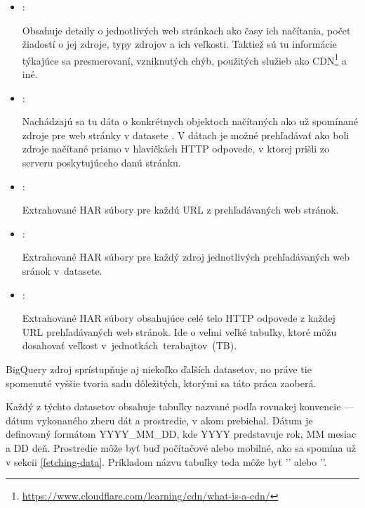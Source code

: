 \begin{itemize}
    \item {}:

    Obsahuje detaily o jednotlivých web stránkach ako časy ich načítania, počet žiadostí o jej zdroje, typy zdrojov a ich veľkosti.
    Taktiež sú tu informácie týkajúce sa presmerovaní, vzniknutých chýb, použitých služieb ako CDN\footnote{\href{https://www.cloudflare.com/learning/cdn/what-is-a-cdn/}{https://www.cloudflare.com/learning/cdn/what-is-a-cdn/}} a iné.
    
    \item {}:

    Nachádzajú sa tu dáta o konkrétnych objektoch načítaných ako už spomínané zdroje pre web stránky v datasete .
    V dátach je možné prehľadávať ako boli zdroje načítané priamo v hlavičkách HTTP odpovede, v ktorej prišli zo serveru poskytujúceho danú stránku.
    
    \item {}:

    Extrahované HAR súbory pre každú URL z prehľadávaných web stránok.
    
    \item {}:

    Extrahované HAR súbory pre každý zdroj jednotlivých prehľadávaných web sránok \mbox{v  datasete}.
    
    \item {}:

    Extrahované HAR súbory obsahujúce celé telo HTTP odpovede z každej URL prehľadávaných web stránok.
    Ide o veľmi veľké tabuľky, ktoré môžu dosahovať veľkost \mbox{v jednotkách terabajtov (TB)}.
\end{itemize}

BigQuery zdroj  sprístupňuje aj niekoľko ďalších datasetov, no práve tie spomenuté vyššie tvoria sadu dôležitých, ktorými sa táto práca zaoberá. 

Každý z týchto datasetov obsahuje tabuľky nazvané podľa rovnakej konvencie --- dátum vykonaného zberu dát a prostredie, v akom prebiehal.
Dátum je definovaný formátom YYYY\_MM\_DD, kde YYYY predstavuje rok, MM mesiac a DD deň. Prostredie môže byť buď počítačové alebo mobilné, ako sa spomína už v sekcii \ref{fetching-data}.
Príkladom názvu tabuľky teda môže byť '' alebo ''.


